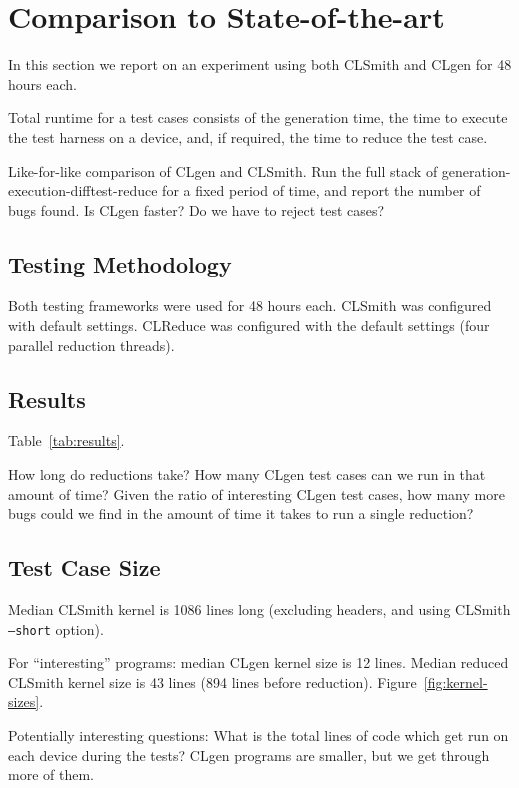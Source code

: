 \section{Comparison to State-of-the-art}

In this section we report on an experiment using both CLSmith and CLgen for 48 hours each.

Total runtime for a test cases consists of the generation time, the time to execute the test harness on a device, and, if required, the time to reduce the test case.

Like-for-like comparison of CLgen and CLSmith. Run the full stack of generation-execution-difftest-reduce for a fixed period of time, and report the number of bugs found. Is CLgen faster? Do we have to reject test cases?

\subsection{Testing Methodology}

Both testing frameworks were used for 48 hours each. CLSmith was configured with default settings. CLReduce was configured with the default settings (four parallel reduction threads).

\subsection{Results}

Table~\ref{tab:results}.



How long do reductions take? How many CLgen test cases can we run in that amount of time? Given the ratio of interesting CLgen test cases, how many more bugs could we find in the amount of time it takes to run a single reduction?

\subsection{Test Case Size}

Median CLSmith kernel is 1086 lines long (excluding headers, and using CLSmith \texttt{--short} option).

For ``interesting'' programs: median CLgen kernel size is 12 lines. Median reduced CLSmith kernel size is 43 lines (894 lines before reduction). Figure~\ref{fig:kernel-sizes}.

Potentially interesting questions: What is the total lines of code which get run on each device during the tests? CLgen programs are smaller, but we get through more of them.

